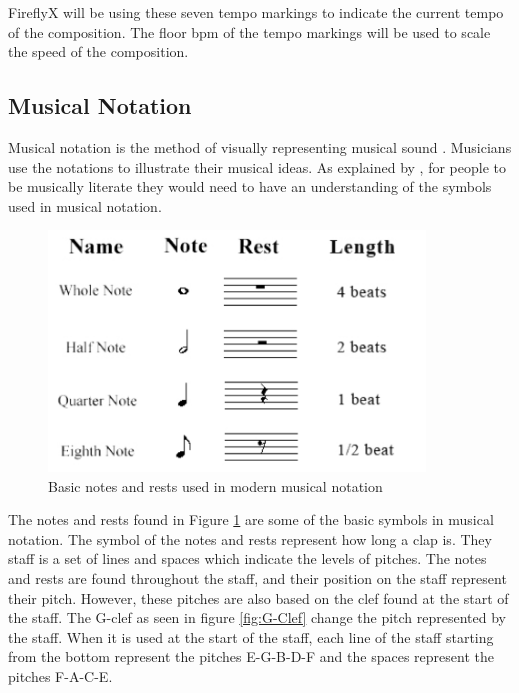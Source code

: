FireflyX will be using these seven tempo markings to indicate the current tempo of the composition. The floor bpm of the tempo markings will be used to scale the speed of the composition.

\subsection{Musical Notation}
Musical notation is the method of visually representing musical sound \cite{read1964music}. Musicians use the notations to illustrate their musical ideas. As explained by , for people to be musically literate they would need to have an understanding of the symbols used in musical notation.

\begin{figure}[H]
    \centering
    \includegraphics[width=10cm ]{figures/BasicMusicNotes.png}
    \caption{Basic notes and rests used in modern musical notation \protect\cite{BasicNotes2016}}
    \label{fig:BasicNotes2016}
\end{figure}

The notes and rests found in Figure \ref{fig:BasicNotes2016} are some of the basic symbols in musical notation. The symbol of the notes and rests represent how long a clap is. They staff is a set of lines and spaces which indicate the levels of pitches. The notes and rests are found throughout the staff, and their position on the staff represent their pitch. However, these pitches are also based on the clef found at the start of the staff. The G-clef as seen in figure \ref{fig:G-Clef} change the pitch represented by the staff. When it is used at the start of the staff, each line of the staff starting from the bottom represent the pitches E-G-B-D-F and the spaces represent the pitches F-A-C-E.

